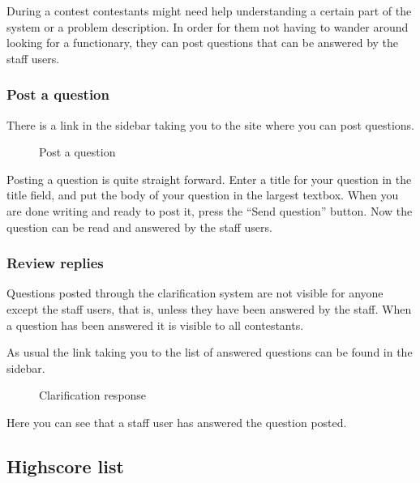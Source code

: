 During a contest contestants might need help understanding a certain
part of the system or a problem description. In order for them not
having to wander around looking for a functionary, they can post
questions that can be answered by the staff users. 

\subsubsection{Post a question}

There is a link in the sidebar taking you to the site where you can post
questions. 

\begin{figure}
\centering
 \caption{Post a question}
 \label{fig:clarificationQuestion}
\end{figure}

Posting a question is quite straight forward. Enter a title for your
question in the title field, and put the body of your question in the
largest textbox. When you are done writing and ready to post it, press
the {\textquotedblleft}Send question{\textquotedblright} button. Now
the question can be read and answered by the staff users. 

\subsubsection{Review replies}

Questions posted through the clarification system are not visible for
anyone except the staff users, that is, unless they have been answered
by the staff. When a question has been answered it is visible to all
contestants.


\bigskip

As usual the link taking you to the list of answered questions can be
found in the sidebar. 

\begin{figure}
\centering
 \caption{Clarification response}
 \label{fig:clarificationResponse}
\end{figure}

Here you can see that a staff user has answered the question posted. 



\subsection{Highscore list}

